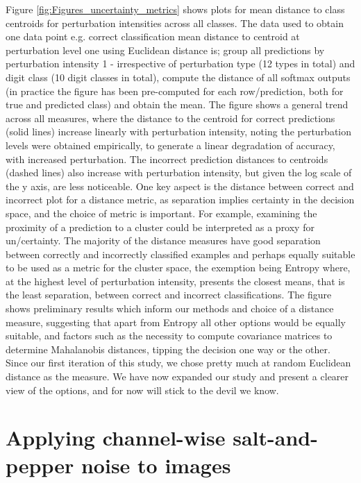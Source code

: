 Figure \ref{fig:Figures_uncertainty_metrics} shows plots for mean distance to class centroids for perturbation intensities across all classes. The data used to obtain one data point e.g. correct classification mean distance to centroid at perturbation level one using Euclidean distance is; group all predictions by perturbation intensity 1 - irrespective of perturbation type (12 types in total) and digit class (10 digit classes in total), compute the distance of all softmax outputs (in practice the figure has been pre-computed for each row/prediction, both for true and predicted class) and obtain the mean.
The figure shows a general trend across all measures, where the distance to the centroid for correct predictions (solid lines) increase linearly with perturbation intensity, noting the perturbation levels were obtained empirically, to generate a linear degradation of accuracy, with increased perturbation. The incorrect prediction distances to centroids (dashed lines) also increase with perturbation intensity, but given the log scale of the y axis, are less noticeable. One key aspect is the distance between correct and incorrect plot for a distance metric, as separation implies certainty in the decision space, and the choice of metric is important. For example, examining the proximity of a prediction to a cluster could be interpreted as a proxy for un/certainty. The majority of the distance measures have good separation between correctly and incorrectly classified examples and perhaps equally suitable to be used as a metric for the cluster space, the exemption being Entropy where, at the highest level of perturbation intensity, presents the closest means, that is the least separation, between correct and incorrect classifications.
The figure shows preliminary results which inform our methods and choice of a distance measure, suggesting that apart from Entropy all other options would be equally suitable, and factors such as the necessity to compute covariance matrices to determine Mahalanobis distances, tipping the decision one way or the other. Since our first iteration of this study, we chose pretty much at random Euclidean distance as the measure. We have now expanded our study and present a clearer view of the options, and for now will stick to the devil we know.

\section{Applying channel-wise salt-and-pepper noise to images}


